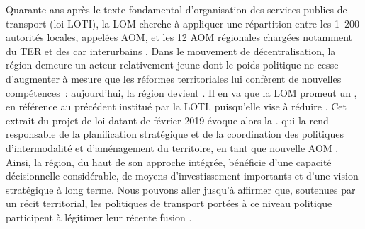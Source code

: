 \begin{refsegment}
{    Quarante ans après le texte fondamental d'organisation des services publics de transport (loi \acrshort{LOTI}), la \acrfull{LOM} cherche à appliquer une répartition entre les 1~200 autorités locales, appelées \acrfull{AOM}, et les 12 \acrshort{AOM} régionales chargées notamment du \acrshort{TER} et des car interurbains \textcolor{blue}{\autocite[29]{richer_quoi_2024}}. Dans le mouvement de décentralisation, la région demeure un acteur relativement jeune dont le poids politique ne cesse d'augmenter à mesure que les réformes territoriales lui confèrent de nouvelles compétences~: aujourd'hui, la région devient  \textcolor{blue}{\autocite[34]{richer_quoi_2024}}. Il en va que la \acrshort{LOM} promeut un , en référence au précédent  institué par la \acrshort{LOTI}, puisqu'elle vise à réduire  \textcolor{blue}{\autocite[283]{izembard_loi_2020}}. Cet extrait du projet de loi datant de février 2019 évoque alors la  \textcolor{blue}{\autocite[2]{ministere_de_la_transition_ecologique_et_solidaire_orientation_2023}}.
} qui la rend responsable de la planification stratégique et de la coordination des politiques d'\gls{intermodalité} et d'aménagement du territoire, en tant que nouvelle \acrfull{AOM}  \textcolor{blue}{\autocites{barone_transports_2020}[174]{sajous_systeme_2020}}. Ainsi, la région, du haut de son approche intégrée, bénéficie d’une capacité décisionnelle considérable, de moyens d’investissement importants et d’une vision stratégique à long terme. Nous pouvons aller jusqu'à affirmer que, soutenues par un récit territorial, les politiques de transport portées à ce niveau politique participent à légitimer leur récente fusion \textcolor{blue}{\autocite[260, 575-577]{revelli_transports_2019}}.%


\end{refsegment}
